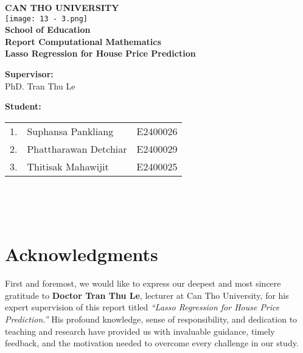 \documentclass[12pt, a4paper]{report}
\begin{document}
\begin{titlepage}
    \begin{center}
        \textbf{\LARGE CAN THO UNIVERSITY}\\
        \vspace{2cm}
        \texttt{[image: 13 - 3.png]} \\
        \vspace{1cm}
        \textbf{\Large School of Education}\\
        \vspace{0.5cm}
        {\Large \textbf{Report Computational Mathematics}}
        \vspace{2cm}\\
        {\Huge \textbf{Lasso Regression for House Price Prediction}}
    \end{center}
\vspace{1cm}
\noindent
\begin{minipage}[l]{0.45\linewidth}
    \textbf{Supervisor:} \\
     PhD. Tran Thu Le
\end{minipage}
\hfill
\begin{minipage}[l]{0.45\linewidth}
    \textbf{Student:} \\
     \begin{tabular}{lll}
    1. & Suphansa Pankliang\phantom{h} & E2400026 \\
    2. & Phattharawan Detchiar & E2400029 \\
    3. & Thitisak Mahawijit & E2400025 \\
\end{tabular}\\
\end{minipage}\\          
\end{titlepage}
\chapter*{Acknowledgments}

First and foremost, we would like to express our deepest and most sincere gratitude to \textbf{Doctor Tran Thu Le}, lecturer at Can Tho University, for his expert supervision of this report titled \textit{“Lasso Regression for House Price Prediction.”} His profound knowledge, sense of responsibility, and dedication to teaching and research have provided us with invaluable guidance, timely feedback, and the motivation needed to overcome every challenge in our study.
\end{document}
